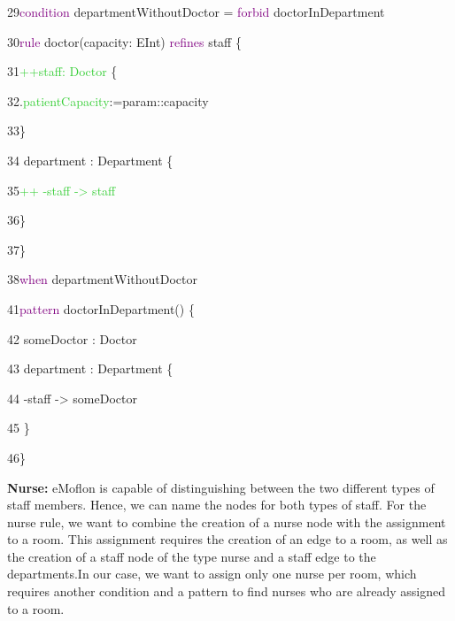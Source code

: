 {

29\hspace{0.5cm}\textcolor{Purple}{condition} departmentWithoutDoctor  = \textcolor{Purple}{forbid} doctorInDepartment 

30\hspace{0.5cm}\textcolor{Purple}{rule} doctor(capacity: EInt) \textcolor{Purple}{refines} staff \{ 

31\hspace{1cm}\textcolor{LimeGreen}{++staff: Doctor} \{

32\hspace{1.5cm}.\textcolor{LimeGreen}{patientCapacity}:=param::capacity

33\hspace{1cm}\}

34\hspace{1cm}		department : Department \{

35\hspace{1.5cm}\textcolor{LimeGreen}{++ -staff -> staff}

36\hspace{1cm}\}

37\hspace{0.5cm}\}

38\hspace{0.5cm}\textcolor{Purple}{when} departmentWithoutDoctor \newline

41\hspace{0.5cm}\textcolor{Purple}{pattern} doctorInDepartment() \{

42\hspace{1cm}		someDoctor : Doctor

43\hspace{1cm}		department : Department \{

44\hspace{1.5cm}			-staff -> someDoctor

45\hspace{1cm}  \}

46\hspace{0.5cm}\}\newline\newline

}
\clearpage

\textbf{Nurse:}\newline
eMoflon is capable of distinguishing between the two different types of staff members. Hence, we can name the nodes for both types of staff. \newline
For the nurse rule, we want to combine the creation of a nurse node with the assignment to a room. This assignment requires the creation of an edge to a room, as well as the creation of a staff node of the type nurse and a staff edge to the departments.\newline In our case, we want to assign only one nurse per room, which requires another condition and a pattern to find nurses who are already assigned to a room.\newline\newline

